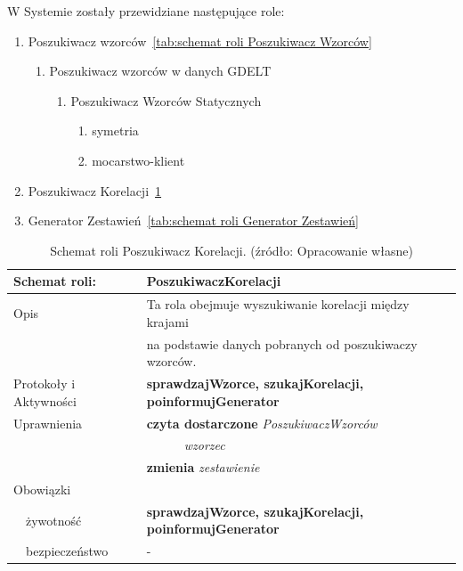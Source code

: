 \documentclass[11pt]{report}
\begin{document}
    W Systemie zostały przewidziane następujące role:

    \begin{enumerate}
        \item Poszukiwacz wzorców~\ref{tab:schemat roli Poszukiwacz Wzorców}
        \begin{enumerate}
            \item Poszukiwacz wzorców w danych GDELT
            \begin{enumerate}
                \item Poszukiwacz Wzorców Statycznych
                \begin{enumerate}
                    \item symetria
                    \item mocarstwo-klient
                \end{enumerate}
            \end{enumerate}
        \end{enumerate}
        \item Poszukiwacz Korelacji~\ref{tab:schemat roli poszukiwacz korelacji}
        \item Generator Zestawień~\ref{tab:schemat roli Generator Zestawień}
    \end{enumerate}

    \begin{table}[ht!]
        \begin{tabular}{ll}
            Schemat roli:          & PoszukiwaczKorelacji                                           \\ \hline
            Opis                   & Ta rola obejmuje wyszukiwanie korelacji między krajami         \\
            & na podstawie danych pobranych od poszukiwaczy wzorców.         \\
            Protokoły i Aktywności & \textbf{sprawdzajWzorce, szukajKorelacji, poinformujGenerator} \\
            Uprawnienia            & \textbf{czyta dostarczone} \textit{PoszukiwaczWzorców}         \\
            & ~~~~~~\textit{wzorzec}                                         \\
            & \textbf{zmienia} \textit{zestawienie}                          \\
            Obowiązki              &                                                                \\
            ~~żywotność            & \textbf{sprawdzajWzorce, szukajKorelacji, poinformujGenerator} \\
            ~~bezpieczeństwo       & -                                                              \\
        \end{tabular}
        \caption{Schemat roli Poszukiwacz Korelacji. (źródło: Opracowanie własne)}
        \label{tab:schemat roli poszukiwacz korelacji}
    \end{table}
\end{document}
